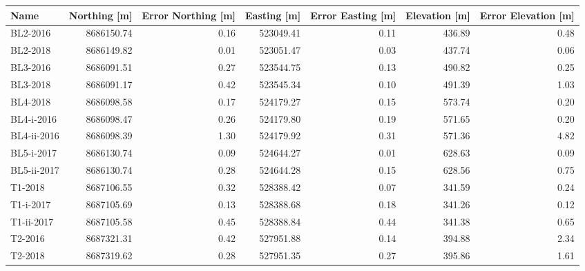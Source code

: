\begin{tabular}{lrrrrrr}
\toprule
        Name &  Northing [m] &  Error Northing [m] &  Easting [m] &  Error Easting [m] &  Elevation [m] &  Error Elevation [m] \\
\midrule
    BL2-2016 &    8686150.74 &                0.16 &    523049.41 &               0.11 &         436.89 &                 0.48 \\
    BL2-2018 &    8686149.82 &                0.01 &    523051.47 &               0.03 &         437.74 &                 0.06 \\
    BL3-2016 &    8686091.51 &                0.27 &    523544.75 &               0.13 &         490.82 &                 0.25 \\
    BL3-2018 &    8686091.17 &                0.42 &    523545.34 &               0.10 &         491.39 &                 1.03 \\
    BL4-2018 &    8686098.58 &                0.17 &    524179.27 &               0.15 &         573.74 &                 0.20 \\
  BL4-i-2016 &    8686098.47 &                0.26 &    524179.80 &               0.19 &         571.65 &                 0.20 \\
 BL4-ii-2016 &    8686098.39 &                1.30 &    524179.92 &               0.31 &         571.36 &                 4.82 \\
  BL5-i-2017 &    8686130.74 &                0.09 &    524644.27 &               0.01 &         628.63 &                 0.09 \\
 BL5-ii-2017 &    8686130.74 &                0.28 &    524644.28 &               0.15 &         628.56 &                 0.75 \\
     T1-2018 &    8687106.55 &                0.32 &    528388.42 &               0.07 &         341.59 &                 0.24 \\
   T1-i-2017 &    8687105.69 &                0.13 &    528388.68 &               0.18 &         341.26 &                 0.12 \\
  T1-ii-2017 &    8687105.58 &                0.45 &    528388.84 &               0.44 &         341.38 &                 0.65 \\
     T2-2016 &    8687321.31 &                0.42 &    527951.88 &               0.14 &         394.88 &                 2.34 \\
     T2-2018 &    8687319.62 &                0.28 &    527951.35 &               0.27 &         395.86 &                 1.61 \\

\end{tabular}
